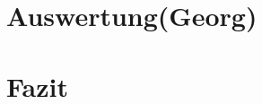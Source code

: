 \documentclass[
a4paper,     %
 headsepline, %
footsepline, %
titlepage,   %
 halfparskip,     %
 fleqn,       %
12pt         %
]{scrartcl}  %
\begin{document}
\section{Auswertung(Georg)}
\section{Fazit}



 \appendix  %

 

 
\end{document}
